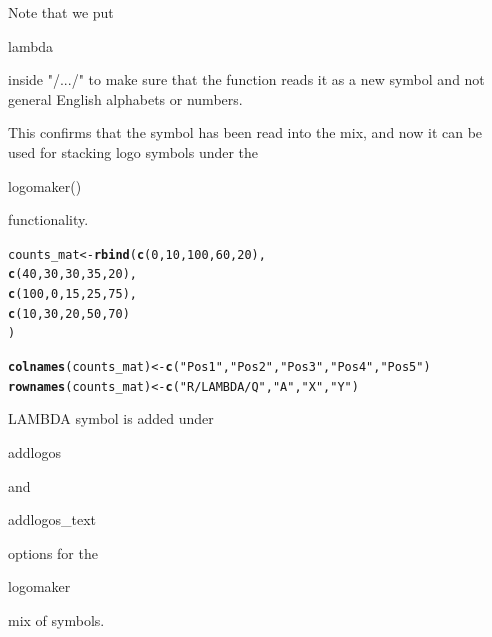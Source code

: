 \documentclass[12pt]{article}\usepackage[]{graphicx}\usepackage[usenames,dvipsnames]{color}
\makeatletter
\newcommand{\hlnum}[1]{\textcolor[rgb]{0.686,0.059,0.569}{#1}}%
\newcommand{\hlstr}[1]{\textcolor[rgb]{0.192,0.494,0.8}{#1}}%
\newcommand{\hlstd}[1]{\textcolor[rgb]{0.345,0.345,0.345}{#1}}%
\newcommand{\hlkwb}[1]{\textcolor[rgb]{0.69,0.353,0.396}{#1}}%
\newcommand{\hlkwd}[1]{\textcolor[rgb]{0.737,0.353,0.396}{\textbf{#1}}}%
\newenvironment{kframe}{%
 \def\at@end@of@kframe{}%
 \ifinner\ifhmode%
  \def\at@end@of@kframe{\end{minipage}}%
  \begin{minipage}{\columnwidth}%
 \fi\fi%
 \def\FrameCommand##1{\hskip\@totalleftmargin \hskip-\fboxsep
 \colorbox{shadecolor}{##1}\hskip-\fboxsep
     \hskip-\linewidth \hskip-\@totalleftmargin \hskip\columnwidth}%
 \MakeFramed {\advance\hsize-\width
   \@totalleftmargin\z@ \linewidth\hsize
   \@setminipage}}%
 {\par\unskip\endMakeFramed%
 \at@end@of@kframe}
\newenvironment{knitrout}{}{} %
\makeatother
\begin{document}
Note that we put \begin{verb} lambda \end{verb} inside "/.../" to make sure that the function reads it as a new symbol and not general English alphabets or numbers.

This confirms that the symbol has been read into the mix, and now it can be used for stacking logo symbols under the \begin{verb} logomaker() \end{verb} functionality.


\begin{knitrout}
\color{fgcolor}\begin{kframe}
\begin{alltt}
\hlstd{counts_mat} \hlkwb{<-} \hlkwd{rbind}\hlstd{(}\hlkwd{c}\hlstd{(}\hlnum{0}\hlstd{,} \hlnum{10}\hlstd{,} \hlnum{100}\hlstd{,} \hlnum{60}\hlstd{,} \hlnum{20}\hlstd{),}
                    \hlkwd{c}\hlstd{(}\hlnum{40}\hlstd{,} \hlnum{30}\hlstd{,} \hlnum{30}\hlstd{,} \hlnum{35}\hlstd{,} \hlnum{20}\hlstd{),}
                    \hlkwd{c}\hlstd{(}\hlnum{100}\hlstd{,} \hlnum{0}\hlstd{,} \hlnum{15}\hlstd{,} \hlnum{25}\hlstd{,} \hlnum{75}\hlstd{),}
                    \hlkwd{c}\hlstd{(}\hlnum{10}\hlstd{,} \hlnum{30}\hlstd{,} \hlnum{20}\hlstd{,} \hlnum{50}\hlstd{,} \hlnum{70}\hlstd{)}
\hlstd{)}

\hlkwd{colnames}\hlstd{(counts_mat)} \hlkwb{<-} \hlkwd{c}\hlstd{(}\hlstr{"Pos 1"}\hlstd{,} \hlstr{"Pos 2"}\hlstd{,} \hlstr{"Pos 3"}\hlstd{,} \hlstr{"Pos 4"}\hlstd{,} \hlstr{"Pos 5"}\hlstd{)}
\hlkwd{rownames}\hlstd{(counts_mat)} \hlkwb{<-} \hlkwd{c}\hlstd{(}\hlstr{"R/LAMBDA/Q"}\hlstd{,} \hlstr{"A"}\hlstd{,} \hlstr{"X"}\hlstd{,} \hlstr{"Y"}\hlstd{)}
\end{alltt}
\end{kframe}
\end{knitrout}

LAMBDA symbol is added under \begin{verb} addlogos \end{verb} and  \begin{verb} addlogos_text \end{verb} options for the \begin{verb} logomaker \end{verb} mix of symbols.
\end{document}
